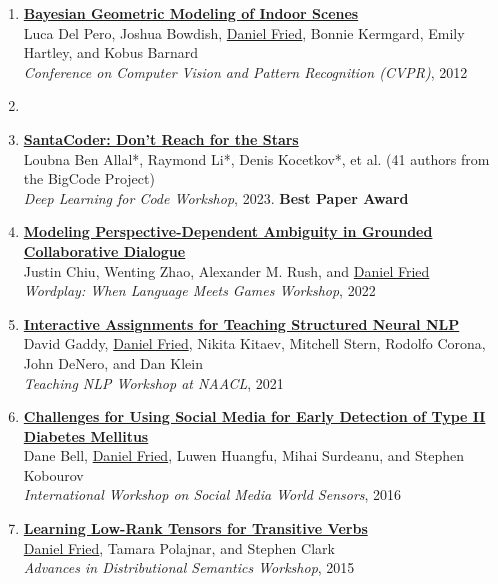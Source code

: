 \begin{enumerate}[leftmargin=-1mm,partopsep=0pt]
  \item \href{https://people.eecs.berkeley.edu/~dfried/papers/Del-Pero-CVPR-12.pdf}{\textbf{Bayesian Geometric Modeling of Indoor Scenes}}\\
    Luca Del Pero, Joshua Bowdish, \underline{Daniel Fried}, Bonnie Kermgard, Emily Hartley, and Kobus Barnard \\
    \emph{Conference on Computer Vision and Pattern Recognition (CVPR)}, 2012

  \item[]

  \item \href{}{\textbf{SantaCoder: Don't Reach for the Stars}} \\
  Loubna Ben Allal*, Raymond Li*, Denis Kocetkov*, et al. (41 authors from the BigCode Project) \\
  \emph{Deep Learning for Code Workshop}, 2023. \textbf{Best Paper Award}

\item \href{https://openreview.net/pdf?id=PkHSHZLig5H}{\textbf{Modeling Perspective-Dependent Ambiguity in Grounded Collaborative Dialogue}} \\
  Justin Chiu, Wenting Zhao, Alexander M. Rush, and \underline{Daniel Fried} \\
  \emph{Wordplay: When Language Meets Games Workshop}, 2022

\item \href{http://nlp.cs.berkeley.edu/pubs/Gaddy-Fried-Kitaev-Stern-Corona-DeNero-Klein_2021_TeachingNLP_paper.pdf}{\textbf{Interactive Assignments for Teaching Structured Neural NLP}} \\
  David Gaddy, \underline{Daniel Fried}, Nikita Kitaev, Mitchell Stern, Rodolfo Corona, John DeNero, and Dan Klein \\
  \emph{Teaching NLP Workshop at NAACL}, 2021

  \item \href{}{\textbf{Challenges for Using Social Media for Early Detection of Type II Diabetes Mellitus}}\\
    Dane Bell, \underline{Daniel Fried}, Luwen Huangfu, Mihai Surdeanu, and Stephen Kobourov\\
    \emph{International Workshop on Social Media World Sensors}, 2016

  \item \href{}{\textbf{Learning Low-Rank Tensors for Transitive Verbs}}\\
    \underline{Daniel Fried}, Tamara Polajnar, and Stephen Clark \\
    \emph{Advances in Distributional Semantics Workshop}, 2015


\end{enumerate}
